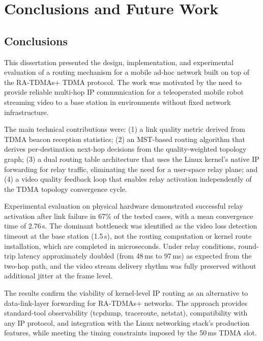 
\chapter{Conclusions and Future Work}
\label{chap:conclusion}

\section{Conclusions}

This dissertation presented the design, implementation, and experimental
evaluation of a routing mechanism for a mobile ad-hoc network built on top
of the RA-TDMAs+ TDMA protocol. The work was motivated by the need to provide
reliable multi-hop IP communication for a teleoperated mobile robot streaming
video to a base station in environments without fixed network infrastructure.

The main technical contributions were: (1) a link quality metric derived from
TDMA beacon reception statistics; (2) an MST-based routing algorithm that
derives per-destination next-hop decisions from the quality-weighted topology
graph; (3) a dual routing table architecture that uses the Linux kernel's
native IP forwarding for relay traffic, eliminating the need for a user-space
relay plane; and (4) a video quality feedback loop that enables relay
activation independently of the TDMA topology convergence cycle.

Experimental evaluation on physical hardware demonstrated successful relay
activation after link failure in 67\% of the tested cases, with a mean
convergence time of 2.76\,s. The dominant bottleneck was identified as the
video loss detection timeout at the base station (1.5\,s), not the routing
computation or kernel route installation, which are completed in microseconds.
Under relay conditions, round-trip latency approximately doubled (from 48\,ms
to 97\,ms) as expected from the two-hop path, and the video stream delivery
rhythm was fully preserved without additional jitter at the frame level.

The results confirm the viability of kernel-level IP routing as an alternative
to data-link-layer forwarding for RA-TDMAs+ networks. The approach provides
standard-tool observability (tcpdump, traceroute, netstat), compatibility
with any IP protocol, and integration with the Linux networking stack's
production features, while meeting the timing constraints imposed by the
50\,ms TDMA slot.

